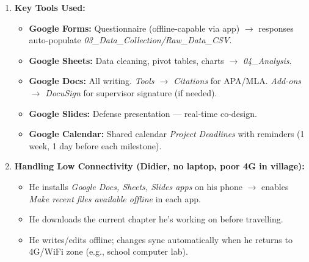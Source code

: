 \documentclass[11pt]{article}
\begin{document}
\begin{exoresolu}
\begin{enumerate}
\begin{itemize}
                  \item \textbf{Editing:} Only edit files \textbf{inside} the Shared Drive (browser). Never download, edit offline, re-upload (creates conflicts).
                  \item \textbf{Comments:} Use \textit{Comment} (@name) for questions; \textit{Suggesting mode} for edits. Resolve comments when done.
                  \item \textbf{Weekly Sync:} Sunday 20:00 on Google Meet (link in Calendar event attached to \textit{01\_Admin/Meeting\_Minutes.docx}). Record for absent members.
                  \item \textbf{Backup:} Awa enables \textit{Drive for Desktop} on her laptop for local sync; others rely on cloud. Monthly, Awa downloads the whole Drive as ZIP to her laptop/USB.
              \end{itemize}
        \item \textbf{Key Tools Used:}
              \begin{itemize}
                  \item \textbf{Google Forms:} Questionnaire (offline-capable via app) $\rightarrow$ responses auto-populate \textit{03\_Data\_Collection/Raw\_Data\_CSV}.
                  \item \textbf{Google Sheets:} Data cleaning, pivot tables, charts $\rightarrow$ \textit{04\_Analysis}.
                  \item \textbf{Google Docs:} All writing. \textit{Tools $\rightarrow$ Citations} for APA/MLA. \textit{Add-ons $\rightarrow$ DocuSign} for supervisor signature (if needed).
                  \item \textbf{Google Slides:} Defense presentation — real-time co-design.
                  \item \textbf{Google Calendar:} Shared calendar \textit{Project Deadlines} with reminders (1 week, 1 day before each milestone).
              \end{itemize}
        \item \textbf{Handling Low Connectivity (Didier, no laptop, poor 4G in village):}
              \begin{itemize}
                  \item He installs \textit{Google Docs, Sheets, Slides apps} on his phone $\rightarrow$ enables \textit{Make recent files available offline} in each app.
                  \item He downloads the current chapter he's working on before travelling.
                  \item He writes/edits offline; changes sync automatically when he returns to 4G/WiFi zone (e.g., school computer lab).

\end{itemize}
\end{enumerate}
\end{exoresolu}
\end{document}
